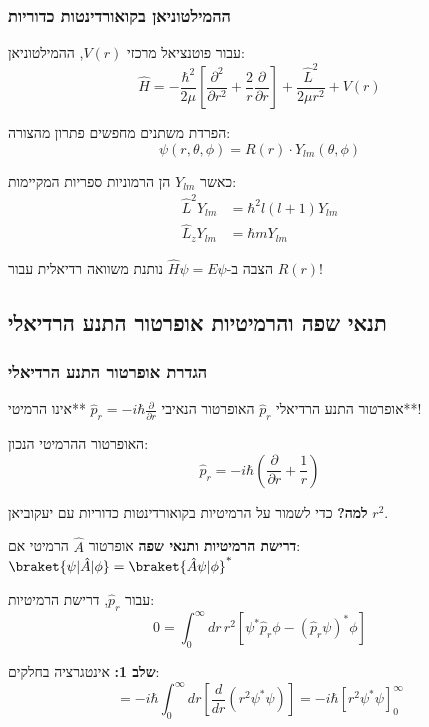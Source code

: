 \subsubsection{ההמילטוניאן בקואורדינטות כדוריות}

עבור פוטנציאל מרכזי $V(r)$, ההמילטוניאן:
\[
\hat{H} = -\frac{\hbar^2}{2\mu}\left[\frac{\partial^2}{\partial r^2} + \frac{2}{r}\frac{\partial}{\partial r}\right] + \frac{\hat{L}^2}{2\mu r^2} + V(r)
\]

\begin{importantbox}{הפרדת משתנים}
מחפשים פתרון מהצורה:
\[
\psi(r,\theta,\phi) = R(r) \cdot Y_{lm}(\theta,\phi)
\]

כאשר $Y_{lm}$ הן הרמוניות ספריות המקיימות:
\begin{align*}
\hat{L}^2 Y_{lm} &= \hbar^2 l(l+1) Y_{lm} \\
\hat{L}_z Y_{lm} &= \hbar m Y_{lm}
\end{align*}

הצבה ב-$\hat{H}\psi = E\psi$ נותנת משוואה רדיאלית עבור $R(r)$!
\end{importantbox}

\subsection{תנאי שפה והרמיטיות אופרטור התנע הרדיאלי}

\subsubsection{הגדרת אופרטור התנע הרדיאלי}

\begin{definitionbox}{אופרטור התנע הרדיאלי $\hat{p}_r$}
האופרטור הנאיבי $\hat{p}_r = -i\hbar \frac{\partial}{\partial r}$ **אינו הרמיטי**!

האופרטור ההרמיטי הנכון:
\[
\hat{p}_r = -i\hbar\left(\frac{\partial}{\partial r} + \frac{1}{r}\right)
\]

\textbf{למה?} כדי לשמור על הרמיטיות בקואורדינטות כדוריות עם יעקוביאן $r^2$.
\end{definitionbox}

\textbf{דרישת הרמיטיות ותנאי שפה}
אופרטור $\hat{A}$ הרמיטי אם: $\braket{\psi|\hat{A}|\phi} = \braket{\hat{A}\psi|\phi}^*$

עבור $\hat{p}_r$, דרישת הרמיטיות:
\[
0 = \int_0^\infty dr \, r^2 \left[\psi^*\hat{p}_r\phi - (\hat{p}_r\psi)^*\phi\right]
\]

\textbf{שלב 1:} אינטגרציה בחלקים:
\[
= -i\hbar \int_0^\infty dr \left[\frac{d}{dr}(r^2\psi^*\psi)\right] = -i\hbar \left[r^2\psi^*\psi\right]_0^\infty
\]

